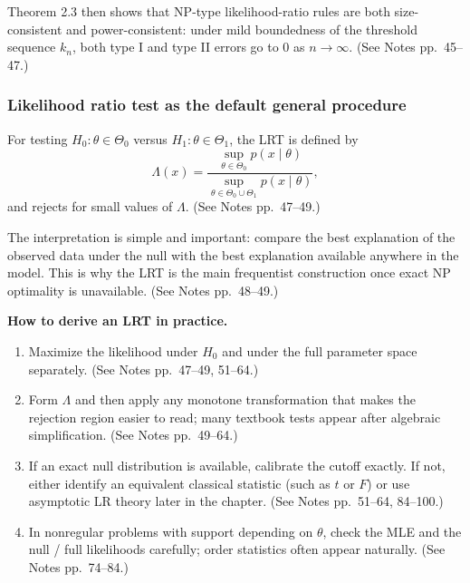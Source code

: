 Theorem 2.3 then shows that NP-type likelihood-ratio rules are both size-consistent and power-consistent: under mild boundedness of the threshold sequence $k_n$, both type I and type II errors go to $0$ as $n \to \infty$. (See Notes pp.~45--47.)

\subsubsection{Likelihood ratio test as the default general procedure}
For testing $H_0:\theta \in \Theta_0$ versus $H_1:\theta \in \Theta_1$, the LRT is defined by
\[
\Lambda(x)=\frac{\sup_{\theta \in \Theta_0} p(x \mid \theta)}{\sup_{\theta \in \Theta_0 \cup \Theta_1} p(x \mid \theta)},
\]
and rejects for small values of $\Lambda$. (See Notes pp.~47--49.)

The interpretation is simple and important: compare the best explanation of the observed data under the null with the best explanation available anywhere in the model. This is why the LRT is the main frequentist construction once exact NP optimality is unavailable. (See Notes pp.~48--49.)

\begin{mybox}
\textbf{How to derive an LRT in practice.}
\begin{enumerate}
    \item Maximize the likelihood under $H_0$ and under the full parameter space separately. (See Notes pp.~47--49, 51--64.)
    \item Form $\Lambda$ and then apply any monotone transformation that makes the rejection region easier to read; many textbook tests appear after algebraic simplification. (See Notes pp.~49--64.)
    \item If an exact null distribution is available, calibrate the cutoff exactly. If not, either identify an equivalent classical statistic (such as $t$ or $F$) or use asymptotic LR theory later in the chapter. (See Notes pp.~51--64, 84--100.)
    \item In nonregular problems with support depending on $\theta$, check the MLE and the null / full likelihoods carefully; order statistics often appear naturally. (See Notes pp.~74--84.)
\end{enumerate}
\end{mybox}

